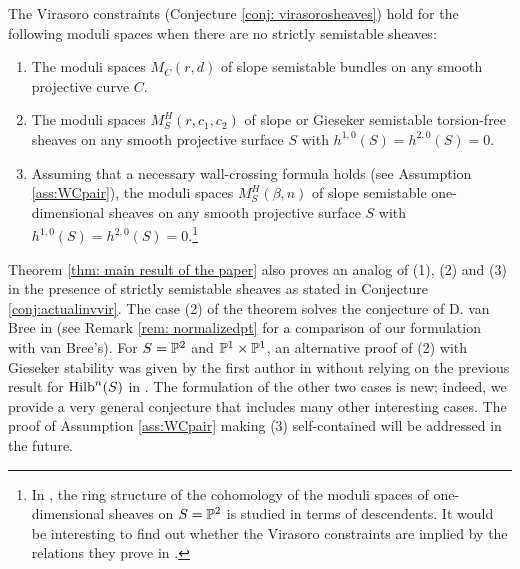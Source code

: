 \documentclass[a4paper, 12pt]{amsart}
\begin{document}
\begin{thm}[=Theorem \ref{thm: main result of the paper}]\label{thm: main} 
The Virasoro constraints (Conjecture \ref{conj: virasorosheaves}) hold for the following moduli spaces when there are no strictly semistable sheaves:
\begin{enumerate}
\item The moduli spaces $M_C(r,d)$ of slope semistable bundles on any smooth projective curve $C$.
\item The moduli spaces $M_S^H(r,c_1, c_2)$ of slope or Gieseker semistable torsion-free sheaves on any smooth projective surface $S$ with $h^{1,0}(S)=h^{2,0}(S)=0$.
\item  Assuming that a necessary wall-crossing formula holds (see Assumption \ref{ass:WCpair}), the moduli spaces $M_S^H(\beta, n)$ of slope semistable one-dimensional sheaves on any smooth projective surface $S$ with $h^{1,0}(S)=h^{2,0}(S)=0$.\footnote{In \cite{Pi22}, the ring structure of the cohomology of the moduli spaces of one-dimensional sheaves
on $S = {\mathbb{P}}^2$ is studied in terms of descendents. It would be interesting to find out whether the
Virasoro constraints are implied by the relations they prove in \cite[Proposition 2.6]{Pi22}.}
\end{enumerate}

\end{thm}

Theorem \ref{thm: main result of the paper} also proves an analog of (1), (2) and (3) in the presence of strictly semistable sheaves as stated in Conjecture \ref{conj:actualinvvir}. The case (2) of the theorem solves the conjecture of D. van Bree in \cite{bree} (see Remark \ref{rem: normalizedpt} for a comparison of our formulation with van Bree's). For $S=\mathbb{P}^2$ and $\mathbb{P}^1\times\mathbb{P}^1$, an alternative proof of (2) with Gieseker stability was given by the first author in \cite{BoVir} without relying on the previous result for $\operatorname{Hilb}^n(S)$ in \cite{moop}. The formulation of the other two cases is new; indeed, we provide a very general conjecture that includes many other interesting cases. The proof of Assumption \ref{ass:WCpair} making (3) self-contained will be addressed in the future. 
\end{document}
